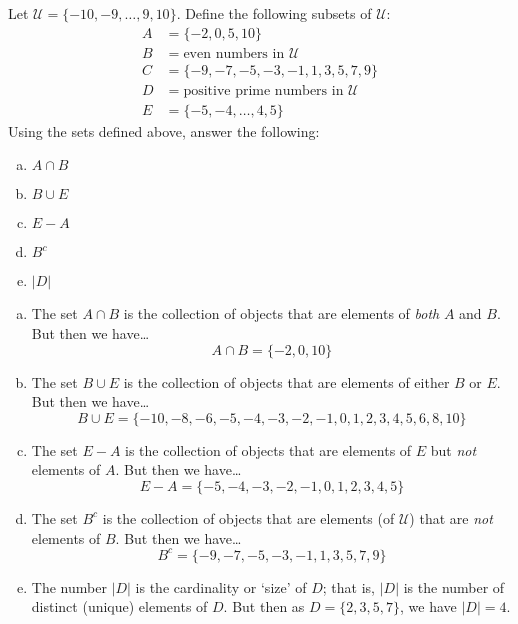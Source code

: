 \documentclass[11pt,letterpaper]{article}
\begin{document}

 Let $\mathcal{U}= \{ -10, -9, \ldots, 9, 10 \}$. Define the following subsets of $\mathcal{U}$:
	\[
	\begin{aligned}
	A&= \{ -2, 0, 5, 10 \} \\
	B&= \text{even numbers in } \mathcal{U} \\
	C&= \{ -9, -7, -5, -3, -1, 1, 3, 5, 7, 9 \} \\
	D&= \text{positive prime numbers in } \mathcal{U} \\
	E&= \{ -5, -4, \ldots, 4, 5 \} 
	\end{aligned}
	\]
Using the sets defined above, answer the following: 
        \begin{enumerate}[(a)]
        \item $A \cap B$
        \item $B \cup E$
        \item $E - A$
        \item $B^c$
        \item $|D|$
        \end{enumerate} \pspace

\sol 
\begin{enumerate}[(a)]
\item The set $A \cap B$ is the collection of objects that are elements of \textit{both} $A$ and $B$. But then we have\dots
	\[
	A \cap B= \{ -2, 0, 10 \}
	\] \pspace

\item The set $B \cup E$ is the collection of objects that are elements of either $B$ or $E$. But then we have\dots
	\[
	B \cup E= \{ -10, -8, -6, -5, -4, -3, -2, -1, 0, 1, 2, 3, 4, 5, 6, 8, 10 \}
	\] \pspace

\item The set $E - A$ is the collection of objects that are elements of $E$ but \textit{not} elements of $A$. But then we have\dots
	\[
	E - A= \{ -5, -4, -3, -2, -1, 0, 1, 2, 3, 4, 5 \}
	\] \pspace

\item The set $B^c$ is the collection of objects that are elements (of $\mathcal{U}$) that are \textit{not} elements of $B$. But then we have\dots
	\[
	B^c= \{ -9, -7, -5, -3, -1, 1, 3, 5, 7, 9 \}
	\] \pspace

\item The number $|D|$ is the cardinality or `size' of $D$; that is, $|D|$ is the number of distinct (unique) elements of $D$. But then as $D= \{ 2, 3, 5, 7 \}$, we have $|D|= 4$. 
\end{enumerate}
\end{document}
